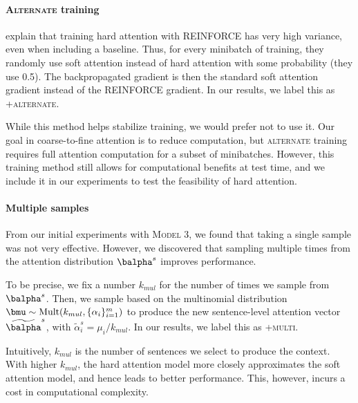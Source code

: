 \documentclass[12pt]{report}
\begin{document}
\paragraph{\textsc{Alternate} training} \citet{xu2015captioning} explain that training hard attention with REINFORCE has very high variance, even when including a baseline. Thus, for every minibatch of training, they randomly use soft attention instead of hard attention with some probability (they use 0.5).
The backpropagated gradient is then the standard soft attention gradient instead of the REINFORCE gradient. In our results, we label this as \textsc{+alternate}.

While this method helps stabilize training, we would prefer not to use it. Our goal in coarse-to-fine attention is to reduce computation, but \textsc{alternate} training requires full attention computation for a subset of minibatches. However, this training method still allows for computational benefits at test time, and we include it in our experiments to test the feasibility of hard attention.


\paragraph{Multiple samples} 
From our initial experiments with \textsc{Model 3}, we found that taking a single sample was not very effective. However, we discovered that sampling multiple times from the attention distribution $\balpha^s$ improves performance.

To be precise, we fix a number $k_{mul}$ for the number of times we sample from $\balpha^s$. Then, we sample based on the multinomial distribution $\bmu \sim \mathrm{Mult}(k_{mul}, \{\alpha_i\}_{i=1}^m)$ to produce the new sentence-level attention vector $\widetilde{\balpha}^s$, with $\widetilde{\alpha}_i^s = \mu_i / k_{mul}$. In our results, we label this as \textsc{+multi}.

Intuitively, $k_{mul}$ is the number of sentences we select to produce the context. With higher $k_{mul}$, the hard attention model more closely approximates the soft attention model, and hence leads to better performance. This, however, incurs a cost in computational complexity.

%
%
%
\end{document}
